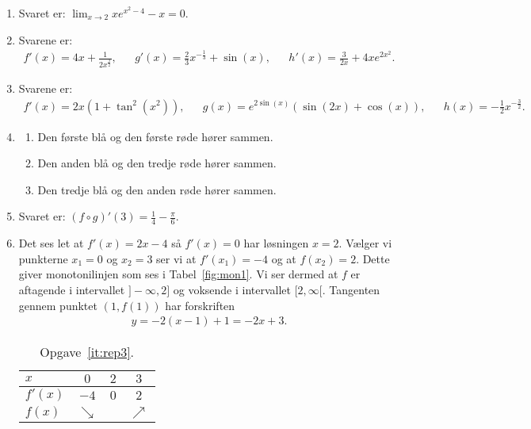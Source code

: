 \begin{enumerate}
	\item Svaret er: $\lim_{x\to 2} xe^{x^2-4}-x=0$.
	
	\item Svarene er:
	\begin{align*}
	f'(x)=4x+\frac{1}{2x^{\frac{3}{2}}},&&g'(x)=\frac{2}{3}x^{-\frac{1}{3}}+\sin(x),&& h'(x)=\frac{3}{2x}+4xe^{2x^2}.
	\end{align*}
	
	\item Svarene er:
	\begin{align*}
	f'(x)=2x(1+\tan^2(x^2)),&& g(x)=e^{2\sin(x)}(\sin(2x)+\cos(x)),&& h(x)=-\frac{1}{2}x^{-\frac{3}{2}}.
	\end{align*}
	
	
	\item\label{it:rep1ans} 	\begin{enumerate}
		\item Den første blå og den første røde hører sammen.
		\item Den anden blå og den tredje røde hører sammen.
		\item Den tredje blå og den anden røde hører sammen.
	\end{enumerate}
	
	\item Svaret er: $(f\circ g)'(3)=\frac{1}{4}-\frac{\pi}{6}$. 
	
	
 	\item\label{it:rep3} Det ses let at $f'(x)=2x-4$ så $f'(x)=0$ har løsningen $x=2$. Vælger vi punkterne $x_1=0$ og $x_2=3$ ser vi at $f'(x_1)=-4$ og at $f(x_2)=2$. Dette giver monotonilinjen som ses i Tabel~\ref{fig:mon1}. Vi ser dermed at $f$ er aftagende i intervallet $ ]-\infty,2] $ og voksende i intervallet $[2,\infty[$. Tangenten gennem punktet $(1,f(1))$ har forskriften
 	\begin{align*}
 	y=-2(x-1)+1=-2x+3.
 	\end{align*}
	
	\begin{table}[h!]
		\centering
		\begin{tabular}{@{}l  c c c@{}}
			$x$      & $0$ 		 & $2$				& $3$			\\ \toprule
			$f'(x)$  & $-4$		 &     $0$ 		 	& $2$			\\ \midrule
			$f(x)$   & $\searrow$&					& $\nearrow$	\\ \bottomrule  
		\end{tabular}
		\caption{Opgave~\ref{it:rep3}.}
		\label{fig:rep3}
	\end{table}
	

\end{enumerate}
